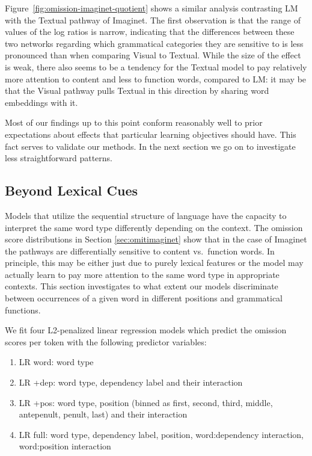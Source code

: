 Figure~\ref{fig:omission-imaginet-quotient} shows a similar analysis
contrasting {\sc LM} with the {\sc Textual} pathway of {\sc
  Imaginet}. The first observation is that the range of values of the
log ratios is narrow, indicating that the differences between these
two networks regarding which grammatical categories they are sensitive
to is less pronounced than when comparing {\sc Visual} to {\sc
  Textual}. While the size of the effect is weak, there also seems to
be a tendency for the {\sc Textual} model to pay relatively more
attention to content and less to function words, compared to
{\sc LM}: it may be that the {\sc Visual} pathway pulls {\sc Textual}
in this direction by sharing word embeddings with it.


Most of our findings up to this point conform reasonably well to prior
expectations about effects that  particular learning objectives should
have. This fact serves to validate our methods. In the next section we
go on to investigate less straightforward patterns.


\subsection{Beyond Lexical Cues}
\label{sec:beyondlexical}

Models that utilize the sequential structure of language
have the capacity to interpret the same word type differently depending on
the context. The omission score distributions in Section \ref{sec:omitimaginet}
show that in the case of {\sc Imaginet} the
pathways are differentially sensitive to content vs.\ function
words. In principle, this may be either just due to purely lexical features or the model
may actually learn to pay more attention to the same word type in appropriate
contexts. This section investigates to what extent our models
discriminate between occurrences of a given word in different positions and
grammatical functions.



We fit four L2-penalized linear regression models which predict the omission
scores per token with the following predictor variables:
\begin{enumerate}
	\item {\sc LR word}: word type
	\item {\sc LR +dep}: word type, dependency label and their interaction
	\item {\sc LR +pos}: word type, position (binned as {\sc first, second, third, middle,
	antepenult, penult, last}) and their interaction
	\item {\sc LR full}: word type, dependency label, position, word:dependency interaction,
	word:position interaction
\end{enumerate}

